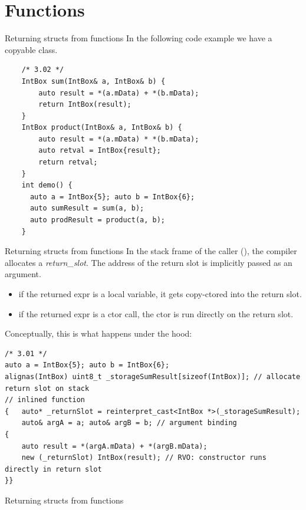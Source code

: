 \section{Functions}

\begin{frame}[fragile]{Returning structs from functions}
  In the following code example we have a copyable  class.\\

  \begin{verbatim}
    /* 3.02 */
    IntBox sum(IntBox& a, IntBox& b) {
        auto result = *(a.mData) + *(b.mData);
        return IntBox(result);
    }
    IntBox product(IntBox& a, IntBox& b) {
        auto result = *(a.mData) * *(b.mData);
        auto retval = IntBox{result};
        return retval;
    }
    int demo() {
      auto a = IntBox{5}; auto b = IntBox{6};
      auto sumResult = sum(a, b);
      auto prodResult = product(a, b);
    }
  \end{verbatim}
\end{frame}

\begin{frame}[fragile]{Returning structs from functions}
  In the stack frame of the caller (), the compiler allocates a \emph{return\_slot}.
  The address of the return slot is implicitly passed as an argument.
  \begin{itemize}
    \item if the returned expr is a local variable, it gets copy-ctored into the return slot.
    \item if the returned expr is a ctor call, the ctor is run directly on the return slot.
  \end{itemize}

  Conceptually, this is what happens under the hood:
  \begin{verbatim}
/* 3.01 */
auto a = IntBox{5}; auto b = IntBox{6};
alignas(IntBox) uint8_t _storageSumResult[sizeof(IntBox)]; // allocate return slot on stack
// inlined function
{   auto* _returnSlot = reinterpret_cast<IntBox *>(_storageSumResult);
    auto& argA = a; auto& argB = b; // argument binding
{
    auto result = *(argA.mData) + *(argB.mData);
    new (_returnSlot) IntBox(result); // RVO: constructor runs directly in return slot
}}
  \end{verbatim}
\end{frame}

\begin{frame}[fragile]{Returning structs from functions}
  
\end{frame}

